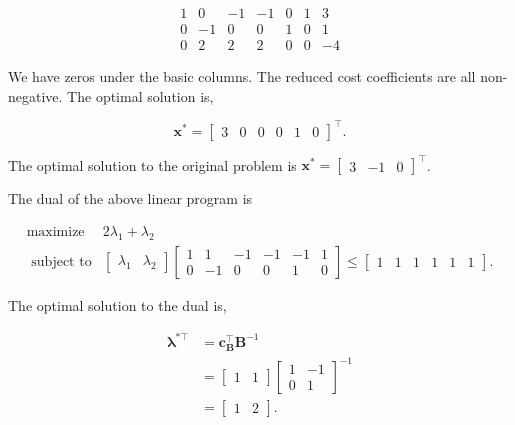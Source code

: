 \[
	\begin{array}{cccccc|c}
		1 & 0 & -1 & -1 & 0 & 1 & 3 \\
		0 & -1 & 0 & 0 & 1 & 0 & 1 \\
		\hline 0 & 2 & 2 & 2 & 0 & 0 & -4
	\end{array}
\]

We have zeros under the basic columns. The reduced cost coefficients are all non-negative. The optimal solution is,

\[
	\boldsymbol{x}^{*}=\left[\begin{array}{llllll}
		3 & 0 & 0 & 0 & 1 & 0
	\end{array}\right]^{\top} .
\]

The optimal solution to the original problem is \(\boldsymbol{x}^{*}=\left[\begin{array}{lll}3 & -1 & 0\end{array}\right]^{\top}\).

The dual of the above linear program is

\[
	\begin{array}{cl}
	\operatorname{maximize} &  2 \lambda_{1}+\lambda_{2} \\
	\text{ subject to} &  
		\left[\begin{array}{ll}\lambda_{1} & \lambda_{2}\end{array}\right]
		\left[\begin{array}{cccccc}1 & 1 & -1 & -1 & -1 & 1 \\ 0 & -1 & 0 & 0 & 1 & 0\end{array}\right] \leq
		\left[\begin{array}{llllll}1 & 1 & 1 & 1 & 1 & 1\end{array}\right].
	\end{array}
\]

The optimal solution to the dual is,

\[
	\begin{aligned}
		\boldsymbol{\lambda}^{* \top} & =\boldsymbol{c}_{\boldsymbol{B}}^{\top} \boldsymbol{B}^{-1} \\
		& =\left[\begin{array}{ll}
			1 & 1
		\end{array}\right]\left[\begin{array}{cc}
			1 & -1 \\
			0 & 1
		\end{array}\right]^{-1} \\
		& =\left[\begin{array}{ll}
			1 & 2
		\end{array}\right] .
	\end{aligned}
\]
